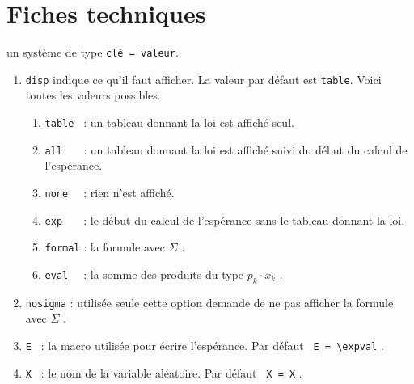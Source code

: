 \documentclass[12pt,a4paper]{article}
\begin{document}

\section{Fiches techniques}

 \hfill {}

                           \hfill {}

\IDoption{} un système de type \texttt{clé = valeur}.

\begin{enumerate}
    \item \verb#disp# indique ce qu'il faut afficher. La valeur par défaut est \verb#table#. Voici toutes les valeurs possibles.
	\begin{enumerate}
    	\item \verb#table # : un tableau donnant la loi est affiché seul.

    	\item \verb#all   # : un tableau donnant la loi est affiché suivi du début du calcul de l'espérance.

    	\item \verb#none  # : rien n'est affiché.
	
		\extraspace

    	\item \verb#exp   # : le début du calcul de l'espérance sans le tableau donnant la loi.

    	\item \verb#formal# : la formule avec $\Sigma$ .

    	\item \verb#eval  # : la somme des produits du type $p_k \cdot x_k$ .
	\end{enumerate}


    \medskip

    \item \verb#nosigma# : utilisée seule cette option demande de ne pas afficher la formule avec $\Sigma$ .


    \medskip

    \item \verb#E # : la macro utilisée pour écrire l'espérance.
		  \hfill
		  Par défaut \verb# E = \expval# .

    \item \verb#X # : le nom de la variable aléatoire.
		  \hfill
		  Par défaut \verb# X = X# .\verb#      #


\end{enumerate}
\end{document}
